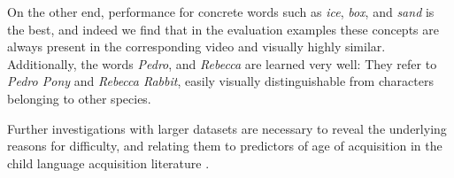 On the other end, performance for concrete words such as \textit{ice}, 
\textit{box}, 
and \textit{sand} is the best, and indeed we find that in the evaluation examples 
these concepts are always present in the corresponding video and visually 
highly similar. Additionally, the words \textit{Pedro}, and \textit{Rebecca} 
are learned very well: They refer to \textit{Pedro Pony} and \textit{Rebecca Rabbit}, 
easily visually distinguishable from characters belonging to other species.

Further investigations with larger datasets are necessary to reveal the 
underlying reasons for difficulty, and relating them to predictors of age of 
acquisition in the child language acquisition literature 
\cite{roy2015predicting,frank2021variability}. 


